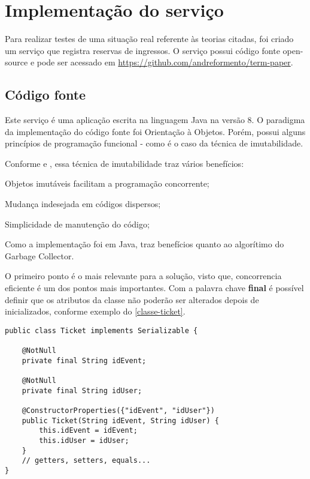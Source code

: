 \chapter{Implementação do serviço}

Para realizar testes de uma situação real referente às teorias citadas, foi
criado um serviço que registra reservas de ingressos. O serviço possui código
fonte open-source e pode ser acessado em
\url{https://github.com/andreformento/term-paper}.

\section{Código fonte}
Este serviço é uma aplicação escrita na linguagem Java na versão 8. O paradigma
da implementação do código fonte foi Orientação à Objetos. Porém, possui alguns
princípios de programação funcional - como é o caso da técnica de imutabilidade.

Conforme
\cite{does-immutability-really-mean-thread-safety} e \cite{java-doc-immutable-objects},
essa técnica de imutabilidade traz vários benefícios:

\begin{alineas}

  \item Objetos imutáveis facilitam a programação concorrente;

  \item Mudança indesejada em códigos dispersos;

  \item Simplicidade de manutenção do código;

  \item Como a implementação foi em Java, traz benefícios quanto ao algorítimo do
        Garbage Collector.

\end{alineas}


O primeiro ponto é o mais relevante para a solução, visto que, concorrencia
eficiente é um dos pontos mais importantes. Com a palavra chave \textbf{final} é
possível definir que os atributos da classe não poderão ser alterados depois
de inicializados, conforme exemplo do \autoref{classe-ticket}.

\begin{lstlisting}[label=classe-ticket,caption=Classe Ticket em Java]
public class Ticket implements Serializable {

    @NotNull
    private final String idEvent;

    @NotNull
    private final String idUser;

    @ConstructorProperties({"idEvent", "idUser"})
    public Ticket(String idEvent, String idUser) {
        this.idEvent = idEvent;
        this.idUser = idUser;
    }
    // getters, setters, equals...
}
\end{lstlisting}

